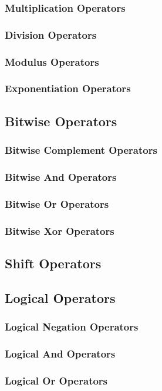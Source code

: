 \documentclass[10pt,twoside,titlepage]{article}
\begin{document}
\subsubsection{Multiplication Operators}
\subsubsection{Division Operators}
\subsubsection{Modulus Operators}
\subsubsection{Exponentiation Operators}
\subsection{Bitwise Operators}
\subsubsection{Bitwise Complement Operators}
\subsubsection{Bitwise And Operators}
\subsubsection{Bitwise Or Operators}
\subsubsection{Bitwise Xor Operators}
\subsection{Shift Operators}
\subsection{Logical Operators}
\subsubsection{Logical Negation Operators}
\subsubsection{Logical And Operators}
\subsubsection{Logical Or Operators}
\end{document}
